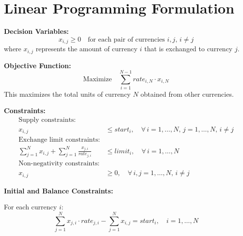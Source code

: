 \documentclass{article}
\begin{document}
\section*{Linear Programming Formulation}

\textbf{Decision Variables:}
\[
x_{i,j} \geq 0 \quad \text{for each pair of currencies } i, j, \, i \neq j
\]
where \( x_{i,j} \) represents the amount of currency \( i \) that is exchanged to currency \( j \).

\textbf{Objective Function:}
\[
\text{Maximize} \quad \sum_{i=1}^{N-1} rate_{i,N} \cdot x_{i,N} 
\]
This maximizes the total units of currency \( N \) obtained from other currencies.

\textbf{Constraints:}
\begin{align*}
\text{Supply constraints:} & \\
x_{i,j} & \leq start_i, \quad \forall \, i = 1, \ldots, N, \, j = 1, \ldots, N, \, i \neq j \\
\text{Exchange limit constraints:} & \\
\sum_{j=1}^{N} x_{i,j} + \sum_{j=1}^{N} \frac{x_{j,i}}{rate_{j,i}} & \leq limit_i, \quad \forall \, i = 1, \ldots, N \\
\text{Non-negativity constraints:} & \\
x_{i,j} & \geq 0, \quad \forall \, i, j = 1, \ldots, N,\, i \neq j
\end{align*}

\textbf{Initial and Balance Constraints:}

For each currency \( i \):
\[
\sum_{j=1}^{N} x_{j,i} \cdot rate_{j,i} - \sum_{j=1}^{N} x_{i,j} = start_i, \quad i = 1, \ldots, N
\]
\end{document}
